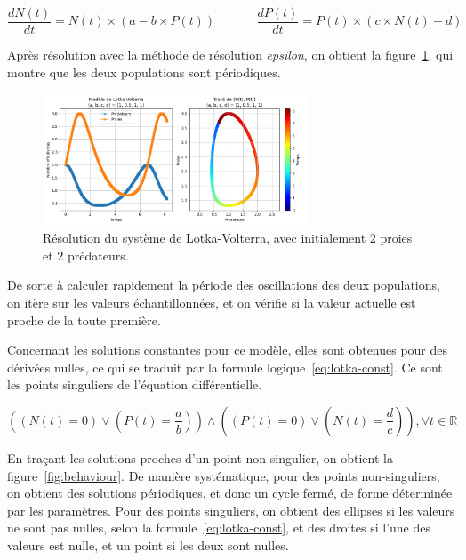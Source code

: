 \begin{equation}
	\label{eq:lotka}
	\frac{dN(t)}{dt} = N(t) \times (a - b \times P(t)) \ \ \ \ \ \ \ \ \ \ \ \ \ \ \
	\frac{dP(t)}{dt} = P(t) \times (c \times N(t) - d)
\end{equation}

Après résolution avec la méthode de résolution \textit{epsilon}, on obtient la figure~\ref{fig:lotka}, qui montre que les deux populations sont périodiques.

\begin{figure}[htbp!]
	\centering
	\includegraphics[width=0.7\textwidth]{res/lotka}
	\caption{Résolution du système de Lotka-Volterra, avec initialement $2$ proies et $2$ prédateurs.}
	\label{fig:lotka}
\end{figure}

De sorte à calculer rapidement la période des oscillations des deux populations, on itère
sur les valeurs échantillonnées, et on vérifie si la valeur actuelle est proche de la toute première.

Concernant les solutions constantes pour ce modèle, elles sont obtenues pour des dérivées nulles,
ce qui se traduit par la formule logique~\ref{eq:lotka-const}. Ce sont les points singuliers
de l'équation différentielle.

\begin{equation}
	\label{eq:lotka-const}
	\left(\left(N(t) = 0\right) \vee \left(P(t) = \frac{a}{b}\right)\right)
	\wedge
	\left(\left(P(t) = 0\right) \vee \left(N(t) = \frac{d}{c}\right)\right), \forall t \in \mathbb{R}
\end{equation}

En traçant les solutions proches d'un point non-singulier, on obtient la figure~\ref{fig:behaviour}. De manière systématique,
pour des points non-singuliers, on obtient des solutions périodiques, et donc un cycle fermé, de forme déterminée par les paramètres.
Pour des points singuliers, on obtient des ellipses si les valeurs ne sont pas nulles, selon la formule~\ref{eq:lotka-const},
et des droites si l'une des valeurs est nulle, et un point si les deux sont nulles.

